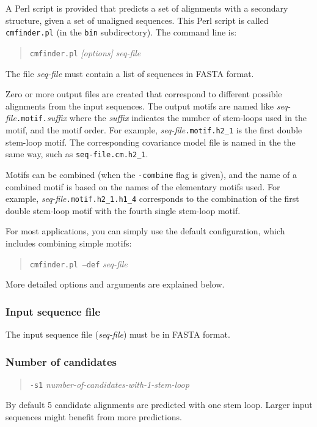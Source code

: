 \documentclass[letterpaper,12pt]{report}
\begin{document}
A Perl script is provided that predicts a set of alignments with a secondary structure, given a set of unaligned sequences. This Perl script is called {\tt cmfinder.pl} (in the {\tt bin} subdirectory).  The command line is:

\begin{quote}
{\tt cmfinder.pl} {\it [options]} {\it seq-file}
\end{quote}

The file {\it seq-file} must contain a list of sequences in FASTA format.

Zero or more output files are created that correspond to different possible alignments from the input sequences.
The output motifs are named like {\it seq-file}{\tt .motif.}{\it suffix} where the {\it suffix} indicates the number of stem-loops used
in the motif, and the motif order. For example, {\it seq-file}{\tt .motif.h2\_1} is the first double stem-loop motif. 
The corresponding covariance model file is named in the the same way, such as {\tt seq-file.cm.h2\_1}.

Motifs can be combined (when the {\tt -combine} flag is given), and the name of a combined motif is based on the names of the elementary motifs used.  For example, {\it seq-file}{\tt .motif.h2\_1.h1\_4} corresponds to the combination of the first double stem-loop motif with the fourth single stem-loop motif.

For most applications, you can simply use the default configuration, which includes combining simple motifs:
\begin{quote}
{\tt cmfinder.pl --def} {\it seq-file}
\end{quote}

More detailed options and arguments are explained below.

\subsubsection{Input sequence file}

The input sequence file ({\it seq-file}) must be in FASTA format.

\subsubsection{Number of candidates}

\begin{quote}
{\tt -s1} {\it number-of-candidates-with-1-stem-loop}
\end{quote}
By default 5 candidate alignments are predicted with one stem loop.  Larger input sequences might benefit from more predictions.
\end{document}
